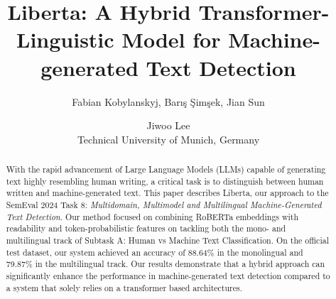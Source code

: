 \documentclass[11pt]{article}
\title{Liberta: A Hybrid Transformer-Linguistic Model for Machine-generated Text Detection}
\author{Fabian Kobylanskyj, Barı\c{s} \c{S}im\c{s}ek, Jian Sun \and Jiwoo Lee \\Technical University of Munich, Germany}
\begin{document}
\maketitle

\begin{abstract}

With the rapid advancement of Large Language Models (LLMs) capable of generating text highly resembling human writing, 
a critical task is to distinguish between human written and machine-generated text. This paper describes Liberta, our approach to the 
SemEval 2024 Task 8: \emph{Multidomain, Multimodel and Multilingual Machine-Generated Text Detection}. Our method 
focused on combining RoBERTa embeddings with readability and token-probabilistic features on tackling both the mono- and multilingual track of 
Subtask A: Human vs Machine Text Classification. 
On the official test dataset, our system achieved an accuracy of 88.64\% in the monolingual and 79.87\% in the multilingual track. Our results 
demonstrate that a hybrid approach can significantly enhance the performance in machine-generated text detection compared to a system that solely 
relies on a transformer based architectures. 

\end{abstract}
\end{document}
